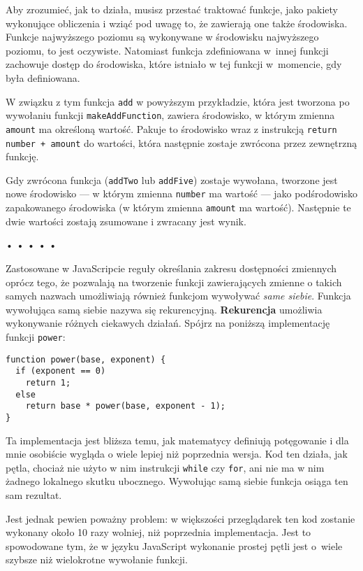 Aby zrozumieć, jak to działa, musisz przestać traktować funkcje, jako pakiety wykonujące obliczenia i wziąć pod uwagę to, że zawierają one także środowiska. Funkcje najwyższego poziomu są wykonywane w środowisku najwyższego poziomu, to jest oczywiste. Natomiast funkcja zdefiniowana w~innej funkcji zachowuje dostęp do środowiska, które istniało w tej funkcji w~momencie, gdy była definiowana.

    
W związku z tym funkcja \texttt{add} w powyższym przykładzie, która jest tworzona po wywołaniu funkcji \texttt{makeAddFunction}, zawiera środowisko, w którym zmienna \texttt{amount} ma określoną wartość. Pakuje to środowisko wraz z instrukcją \texttt{return number + amount} do wartości, która następnie zostaje zwrócona przez zewnętrzną funkcję.

    
Gdy zwrócona funkcja (\texttt{addTwo} lub \texttt{addFive}) zostaje wywołana, tworzone jest nowe środowisko — w którym zmienna \texttt{number} ma wartość — jako podśrodowisko zapakowanego środowiska (w którym zmienna \texttt{amount} ma wartość). Następnie te dwie wartości zostają zsumowane i zwracany jest wynik.

  
  
\begin{center}
• • • • •
\end{center}
  
    
Zastosowane w JavaScripcie reguły określania zakresu dostępności zmiennych oprócz tego, że pozwalają na tworzenie funkcji zawierających zmienne o takich samych nazwach umożliwiają również funkcjom wywoływać \emph{same siebie}. Funkcja wywołująca samą siebie nazywa się rekurencyjną. \textbf{Rekurencja} umożliwia wykonywanie różnych ciekawych działań. Spójrz na poniższą implementację funkcji \texttt{power}:

    
\begin{verbatim} 
function power(base, exponent) {
  if (exponent == 0)
    return 1;
  else
    return base * power(base, exponent - 1);
}
\end{verbatim}
    
Ta implementacja jest bliższa temu, jak matematycy definiują potęgowanie i dla mnie osobiście wygląda o wiele lepiej niż poprzednia wersja. Kod ten działa, jak pętla, chociaż nie użyto w nim instrukcji \texttt{while} czy \texttt{for}, ani  nie ma w nim żadnego lokalnego skutku ubocznego. Wywołując samą siebie funkcja osiąga ten sam rezultat.

    
Jest jednak pewien poważny problem: w większości przeglądarek ten kod zostanie wykonany około 10 razy wolniej, niż poprzednia implementacja. Jest to spowodowane tym, że w języku JavaScript wykonanie prostej pętli jest o~wiele szybsze niż wielokrotne wywołanie funkcji.

